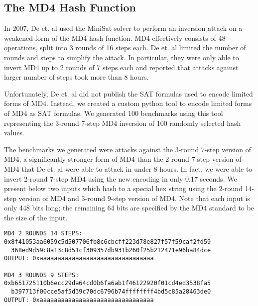 \subsection{The MD4 Hash Function}

\label{sec:encoding:md4}

In 2007, De et. al \cite{DKV07} used the MiniSat solver to perform an inversion attack on a weakened form of the MD4 hash function. MD4 effectively consists of 48 operations, split into 3 rounds of 16 steps each. De et. al limited the number of rounds and steps to simplify the attack. In particular, they were only able to invert MD4 up to 2 rounds of 7 steps each and reported that attacks against larger number of steps took more than 8 hours.

Unfortunately, De et. al did not publish the SAT formulas used to encode limited forms of MD4. Instead, we created a custom python tool to encode limited forms of MD4 as SAT formulas. We generated 100 benchmarks using this tool representing the 3-round 7-step MD4 inversion of 100 randomly selected hash values.

The benchmarks we generated were attacks against the 3-round 7-step version of MD4, a significantly stronger form of MD4 than the 2-round 7-step version of MD4 that De et. al were able to attack in under 8 hours. In fact, we were able to invert 2-round 7-step MD4 using the new encoding in only 0.17 seconds. We present below two inputs which hash to a special hex string using the 2-round 14-step version of MD4 and 3-round 9-step version of MD4. Note that each input is only 448 bits long; the remaining 64 bits are specified by the MD4 standard to be the size of the input.

\begin{verbatim}
MD4 2 ROUNDS 14 STEPS:
0x8f41053aa6059c5d507706fb8c6cbcff223d78e827f57f59caf2fd59
  368ed9d59c8a13c8d51cf309357db931b260f25b212471e96ba84dce
OUTPUT: 0xaaaaaaaaaaaaaaaaaaaaaaaaaaaaaaaa

MD4 3 ROUNDS 9 STEPS:
0xb651725110b6ecc29da64cd0b6fa6ab1f46122920f01cd4ed3538fa5
  b397713f00cce5af5d39c70dc6796b74ffffffff4bd5c85a28463de0
OUTPUT: 0xaaaaaaaaaaaaaaaaaaaaaaaaaaaaaaaa
\end{verbatim}


